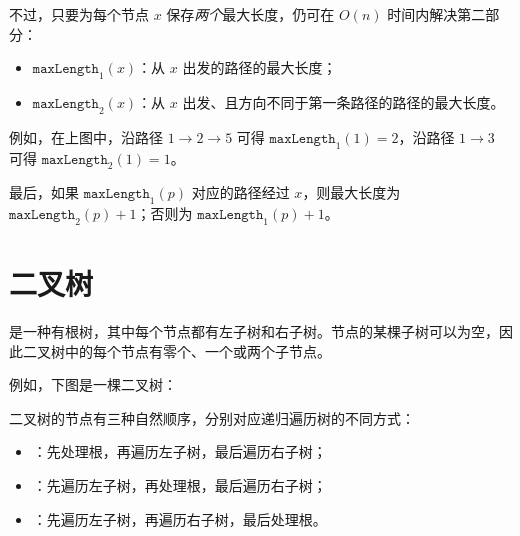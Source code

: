 不过，只要为每个节点 $x$ 保存\emph{两个}最大长度，仍可在 $O(n)$ 时间内解决第二部分：
\begin{itemize}
\item $\texttt{maxLength}_1(x)$：从 $x$ 出发的路径的最大长度；
\item $\texttt{maxLength}_2(x)$：从 $x$ 出发、且方向不同于第一条路径的路径的最大长度。
\end{itemize}
例如，在上图中，沿路径 $1 \rightarrow 2 \rightarrow 5$ 可得 $\texttt{maxLength}_1(1)=2$，沿路径 $1 \rightarrow 3$ 可得 $\texttt{maxLength}_2(1)=1$。

最后，如果 $\texttt{maxLength}_1(p)$ 对应的路径经过 $x$，则最大长度为 $\texttt{maxLength}_2(p)+1$；否则为 $\texttt{maxLength}_1(p)+1$。

\section{二叉树}


\begin{samepage}
是一种有根树，其中每个节点都有左子树和右子树。节点的某棵子树可以为空，因此二叉树中的每个节点有零个、一个或两个子节点。

例如，下图是一棵二叉树：
\begin{center}
\end{center}
\end{samepage}


二叉树的节点有三种自然顺序，分别对应递归遍历树的不同方式：

\begin{itemize}
\item {}：先处理根，再遍历左子树，最后遍历右子树；
\item {}：先遍历左子树，再处理根，最后遍历右子树；
\item {}：先遍历左子树，再遍历右子树，最后处理根。
\end{itemize}

